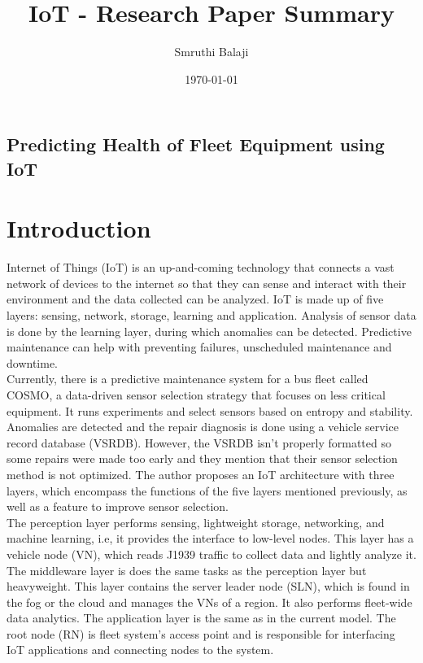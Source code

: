 \documentclass{report}
\title{IoT - Research Paper Summary}
\author{Smruthi Balaji}
\date{\today}
\begin{document}
    
    
    \begin{center}
        \section*{Predicting Health of Fleet Equipment using IoT}
    \end{center}
\setlength{\columnsep}{1.0cm}
    \large
    \section*{Introduction}
    Internet of Things (IoT) is an up-and-coming technology that connects a vast network of devices to the internet so that they can sense and interact with their environment and the data collected can be analyzed. IoT is made up of five layers: sensing, network, storage, learning and application. Analysis of sensor data is done by the learning layer, during which anomalies can be detected. Predictive maintenance can help with preventing failures, unscheduled maintenance and downtime.\\
    
    Currently, there is a predictive maintenance system for a bus fleet called COSMO, a data-driven sensor selection strategy that focuses on less critical equipment. It runs experiments and select sensors based on entropy and stability. Anomalies are detected and the repair diagnosis is done using a vehicle service record database (VSRDB). However, the VSRDB isn't properly formatted so some repairs were made too early and they mention that their sensor selection method is not optimized. The author proposes an IoT architecture with three layers, which encompass the functions of the five layers mentioned previously, as well as a feature to improve sensor selection.\\  
    
    The perception layer performs sensing, lightweight storage, networking, and machine learning, i.e, it provides the interface to low-level nodes. This layer has a vehicle node (VN), which reads J1939 traffic to collect data and lightly analyze it. The middleware layer is does the same tasks as the perception layer but heavyweight. This layer contains the server leader node (SLN), which is found in the fog or the cloud and manages the VNs of a region. It also performs fleet-wide data analytics. The application layer is the same as in the current model. The root node (RN) is fleet system's access point and is responsible for interfacing IoT applications and connecting nodes to the system.\\
    
\end{document}
